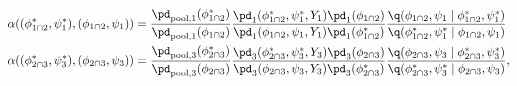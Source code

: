 \begin{align}
  \alpha((\phi_{1 \cap 2}^{*}, \psi_{1}^{*}), (\phi_{1 \cap 2}, \psi_{1})) &= 
  \frac {
    \pd_{\text{pool}, 1} (\phi_{1 \cap 2}^{*})
  } {
    \pd_{\text{pool}, 1} (\phi_{1 \cap 2})
  }
  \frac {
    \pd_{1}(\phi_{1 \cap 2}^{*}, \psi_{1}^{*}, Y_{1})
    \pd_{1}(\phi_{1 \cap 2})
  } {
    \pd_{1}(\phi_{1 \cap 2}, \psi_{1}, Y_{1})
    \pd_{1}(\phi_{1 \cap 2}^{*})
  }
  \frac {
    \q(\phi_{1 \cap 2}, \psi_{1} \mid \phi_{1 \cap 2}^{*}, \psi_{1}^{*})
  } {
    \q(\phi_{1 \cap 2}^{*}, \psi_{1}^{*} \mid \phi_{1 \cap 2}, \psi_{1})
  } \\
  \alpha((\phi_{2 \cap 3}^{*}, \psi_{3}^{*}), (\phi_{2 \cap 3}, \psi_{3})) &= 
  \frac {
    \pd_{\text{pool}, 3} (\phi_{2 \cap 3}^{*})
  } {
    \pd_{\text{pool}, 3} (\phi_{2 \cap 3})
  }
  \frac {
    \pd_{3}(\phi_{2 \cap 3}^{*}, \psi_{3}^{*}, Y_{3})
    \pd_{3}(\phi_{2 \cap 3})
  } {
    \pd_{3}(\phi_{2 \cap 3}, \psi_{3}, Y_{3})
    \pd_{3}(\phi_{2 \cap 3}^{*})
  }
  \frac {
    \q(\phi_{2 \cap 3}, \psi_{3} \mid \phi_{2 \cap 3}^{*}, \psi_{3}^{*})
    } {
    \q(\phi_{2 \cap 3}^{*}, \psi_{3}^{*} \mid \phi_{2 \cap 3}, \psi_{3})
  },  
  \label{eqn:stage-one-acceptance-probs}  
\end{align}